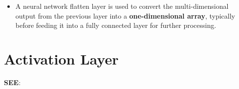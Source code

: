 \begin{itemize}
    \item A neural network flatten layer is used to convert the multi-dimensional output from the previous layer into a \textbf{one-dimensional array}, typically before feeding it into a fully connected layer for further processing.

    
\end{itemize}



\section{Activation Layer}
\textbf{SEE}: 

















































































